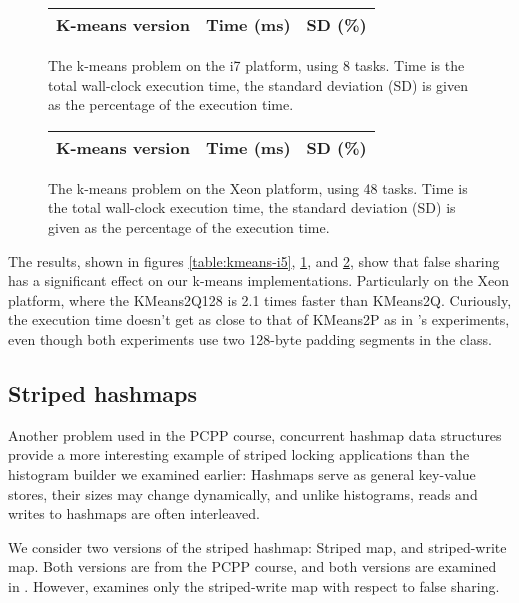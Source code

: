 \begin{figure}[hbtp]
	\centering
	\begin{tabular}{l r r}
		\hline
		\hline
		K-means version & Time (ms) & SD (\%) \\
		\hline
		
		\hline
		\hline
	\end{tabular}
	\caption{The k-means problem on the i7 platform, using 8 tasks.  Time is
	the total wall-clock execution time, the standard deviation (SD) is
	given as the percentage of the execution time.}
	\label{table:kmeans-i7}
\end{figure}

\begin{figure}[hbtp]
	\centering
	\begin{tabular}{l r r}
		\hline
		\hline
		K-means version & Time (ms) & SD (\%) \\
		\hline
		
		\hline
		\hline
	\end{tabular}
	\caption{The k-means problem on the Xeon platform, using 48 tasks.
	Time is the total wall-clock execution time, the standard deviation (SD)
	is given as the percentage of the execution time.}
	\label{table:kmeans-xeon}
\end{figure}

The results, shown in figures \ref{table:kmeans-i5}, \ref{table:kmeans-i7}, and
\ref{table:kmeans-xeon}, show that false sharing has a significant effect on our 
k-means implementations. Particularly on the Xeon platform, where the KMeans2Q128
is 2.1 times faster than KMeans2Q. Curiously, the execution time doesn't get as
close to that of KMeans2P as in \citeauthor{mystery}'s experiments, even though
both experiments use two 128-byte padding segments in the  class.

\subsection{Striped hashmaps}
Another problem used in the PCPP course, concurrent hashmap data structures
provide a more interesting example of striped locking applications than the
histogram builder we examined earlier: Hashmaps serve as general key-value
stores, their sizes may change dynamically, and unlike histograms, reads
and writes to hashmaps are often interleaved.

We consider two versions of the striped hashmap: Striped map, and striped-write
map. Both versions are from the PCPP course, and both versions are examined in
\cite{mystery}. However, \cite{mystery} examines only the striped-write map
with respect to false sharing.

